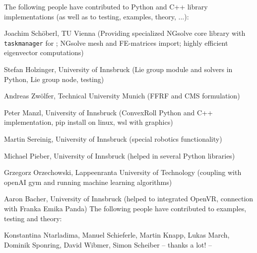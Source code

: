 The following people have contributed to Python and C++ library implementations (as well as to testing, examples, theory, ...):
\bi
  \item Joachim Sch{\"o}berl, TU Vienna (Providing specialized NGsolve \cite{Schoeberl1997,NGsolve2014,NGsolve2022} core library with \texttt{taskmanager} for ; NGsolve mesh and FE-matrices import; highly efficient eigenvector computations)
  \item Stefan Holzinger, University of Innsbruck (Lie group module and solvers in Python, Lie group node, testing)
  \item Andreas Zw{\"o}lfer, Technical University Munich (FFRF and CMS formulation)
  \item Peter Manzl, University of Innsbruck (ConvexRoll Python and C++ implementation, pip install on linux, wsl with graphics)
  \item Martin Sereinig, University of Innsbruck (special robotics functionality)
  \item Michael Pieber, University of Innsbruck (helped in several Python libraries)
  \item Grzegorz Orzechowski, Lappeenranta University of Technology (coupling with openAI gym and running machine learning algorithms)
  \item Aaron Bacher, University of Innsbruck (helped to integrated OpenVR, connection with Franka Emika Panda)
\ei
The following people have contributed to examples, testing and theory:
\bi
  \item Konstantina Ntarladima, Manuel Schieferle, Martin Knapp, Lukas March, Dominik Sponring, David Wibmer, Simon Scheiber
\ei
-- thanks a lot! --
%
\newpage
{}
\label{sec:installationInstructions}
%

